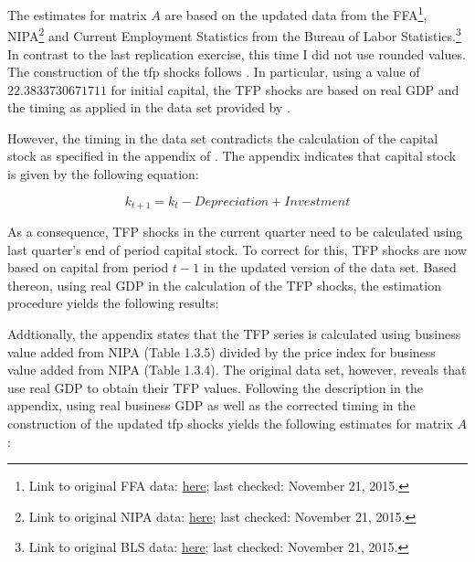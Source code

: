 
The estimates for matrix $A$ are based on the updated data from the FFA\footnote{Link to original FFA data: \href{http://www.federalreserve.gov/datadownload/Download.aspx?rel=Z1&series=0158dbd07710fd0793be0d27731bac4c&filetype=spreadsheetml&label=include&layout=seriescolumn&from=03/01/1952&to=12/31/2015}{here}; last checked: November 21, 2015.},
NIPA\footnote{Link to original NIPA data: \href{http://www.bea.gov//national/nipaweb/DownSS2.asp}{here}; last checked: November 21, 2015.} 
and Current Employment Statistics from the Bureau of Labor Statistics.\footnote{Link to original BLS data: \href{https://research.stlouisfed.org/fred2/series/AWHI/downloaddata}{here}; last checked: November 21, 2015.} 
In contrast to the last replication exercise, this time I did not use rounded values. The construction of the tfp shocks follows \citet{JERMANNfinancial}. In particular, using a value of $22.3833730671711$ for initial capital, the TFP shocks are based on real GDP and the timing as applied in the data set provided by \citeauthor{JERMANNfinancial}.

However, the timing in the data set contradicts the calculation of the capital stock as specified in the appendix of \citeauthor{JERMANNfinancial}. The appendix indicates that capital stock is given by the following equation:

\begin{equation} \label{eq:capital_stock}
k_{t+1} = k_{t} - Depreciation + Investment
\end{equation} 

As a consequence, TFP shocks in the current quarter need to be calculated using last quarter's end of period capital stock. To correct for this, TFP shocks are now based on capital from period $t-1$ in the updated version of the data set. Based thereon, using real GDP in the calculation of the TFP shocks, the estimation procedure yields the following results:


Addtionally, the appendix states that the TFP series is calculated using business value added from NIPA (Table 1.3.5) divided by the price index for business value added from NIPA (Table 1.3.4). The original data set, however, reveals that \citeauthor{JERMANNfinancial} use real GDP to obtain their TFP values. Following the description in the appendix, using real business GDP as well as the corrected timing in the construction of the updated tfp shocks yields the following estimates for matrix $A$:


